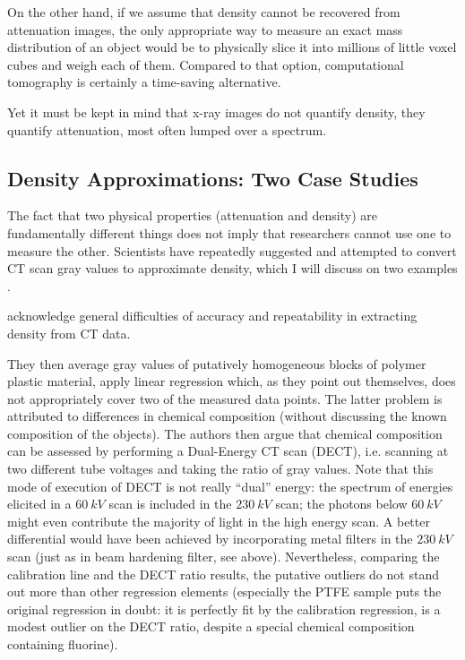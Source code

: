 On the other hand, if we assume that density cannot be recovered from attenuation images, the only appropriate way to measure an exact mass distribution of an object would be to physically slice it into millions of little voxel cubes and weigh each of them.
Compared to that option, computational tomography is certainly a time-saving alternative.


Yet it must be kept in mind that x-ray images do not quantify density, they quantify attenuation, most often lumped over a spectrum.


\subsection{Density Approximations: Two Case Studies}
\label{sec:org7243d9a}
The fact that two physical properties (attenuation and density) are fundamentally different things does not imply that researchers cannot use one to measure the other.
Scientists have repeatedly suggested and attempted to convert CT scan gray values to approximate density, which I will discuss on two examples \citep{DuPlessis2013,Durston2022}.


\citet{DuPlessis2013} acknowledge general difficulties of accuracy and repeatability in extracting density from CT data.

They then average gray values of putatively homogeneous blocks of polymer plastic material, apply linear regression which, as they point out themselves, does not appropriately cover two of the measured data points.
The latter problem is attributed to differences in chemical composition (without discussing the known composition of the objects).
The authors then argue that chemical composition can be assessed by performing a Dual-Energy CT scan (DECT), i.e. scanning at two different tube voltages and taking the ratio of gray values.
Note that this mode of execution of DECT is not really ``dual'' energy: the spectrum of energies elicited in a \(60\ kV\) scan is included in the \(230\ kV\) scan; the photons below \(60\ kV\) might even contribute the majority of light in the high energy scan.
A better differential would have been achieved by incorporating metal filters in the \(230\ kV\) scan (just as in beam hardening filter, see above).
Nevertheless, comparing the calibration line and the DECT ratio results, the putative outliers do not stand out more than other regression elements (especially the PTFE sample puts the original regression in doubt: it is perfectly fit by the calibration regression, is a modest outlier on the DECT ratio, despite a special chemical composition containing fluorine).

